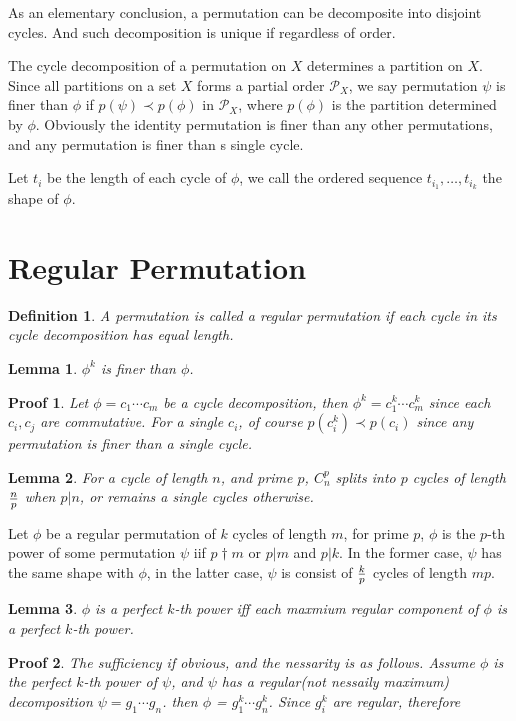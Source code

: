 \documentclass{article}
\newtheorem{defi}{Definition}
\newtheorem{lem}{Lemma}
\newtheorem{prof}{Proof}
\begin{document}
As an elementary conclusion, a permutation can be decomposite into disjoint cycles.
And such decomposition is unique if regardless of order.

The cycle decomposition of a permutation on $X$ determines a partition on $X$.
Since all partitions on a set $X$ forms a partial order $\mathcal P_X$,
we say permutation $\psi$ is finer than $\phi$ if $p(\psi) \prec p(\phi)$ in $\mathcal P_X$,
where $p(\phi)$ is the partition determined by $\phi$.
Obviously the identity permutation is finer than any other permutations,
and any permutation is finer than s single cycle.

Let $t_i$ be the length of each cycle of $\phi$,
we call the ordered sequence $t_{i_1}, \dots, t_{i_k}$ the shape of $\phi$.

\section{Regular Permutation}
\begin{defi}
A permutation is called a regular permutation if each cycle
in its cycle decomposition has equal length.
\end{defi}

\begin{lem}
$\phi^k$ is finer than $\phi$.
\end{lem}

\begin{prof}
Let $\phi = c_1 \cdots c_m$ be a cycle decomposition,
then $\phi^k = c_1^k \cdots c_m^k$ since each $c_i, c_j$ are commutative.
For a single $c_i$, of course $p(c_i^k) \prec p(c_i)$ since any permutation is
finer than a single cycle.
\end{prof}

\begin{lem}
For a cycle of length $n$, and prime $p$,
$C_n^p$ splits into $p$ cycles of length $n \over p$ when $p \vert n$,
or remains a single cycles otherwise.
\end{lem}

Let $\phi$ be a regular permutation of $k$ cycles of length $m$,
for prime $p$, $\phi$ is the $p$-th power of some permutation $\psi$
iif $p \dagger m$ or $p \vert m$ and $p \vert k$.
In the former case, $\psi$ has the same shape with $\phi$,
in the latter case, $\psi$ is consist of $k \over p$ cycles of length $mp$.

\begin{lem}
$\phi$ is a perfect $k$-th power iff each maxmium
regular component of $\phi$ is a perfect $k$-th power.
\end{lem}

\begin{prof}
The sufficiency if obvious, and the nessarity is as follows.
Assume $\phi$ is the perfect $k$-th power of $\psi$,
and $\psi$ has a regular(not nessaily maximum) decomposition $\psi = g_1 \cdots g_n$.
then $\phi$ = $g_1^k \cdots g_n^k$. Since $g_i^k$ are regular, therefore
\end{prof}
\end{document}
